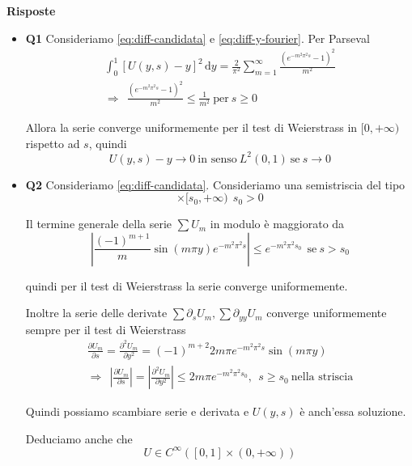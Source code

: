 \documentclass[10pt,a4paper,twoside,openright]{book}
\newcommand{\de}{\,\mathrm d}
\newcommand{\dy}{\de y}
\begin{document}
\textbf{Risposte}
\begin{itemize}
\item \textbf{Q1} Consideriamo \eqref{eq:diff-candidata} e \eqref{eq:diff-y-fourier}. Per Parseval
\begin{gather*}
    \int ^{1}_{0}[ U(y,s) -y]^{2} \dy=\frac{2}{\pi ^{2}}\sum\limits ^{\infty }_{m=1}\frac{\left(e^{-m^{2} \pi ^{2} s} -1\right)^{2}}{m^{2}}\\
    \Rightarrow \ \ \frac{\left(e^{-m^{2} \pi ^{2} s} -1\right)^{2}}{m^{2}} \leqslant \frac{1}{m^{2}} \ \text{per} \ s\geqslant 0
\end{gather*}

Allora la serie converge uniformemente per il test di Weierstrass in $[ 0,+\infty)$ rispetto ad $s$, quindi
\begin{equation*}
    U(y,s) -y\rightarrow 0\ \text{in senso} \ L^{2}(0,1) \ \text{se} \ s\rightarrow 0
\end{equation*}
\item \textbf{Q2} Consideriamo \eqref{eq:diff-candidata}. Consideriamo una semistriscia del tipo
\begin{equation*}
    [ 0,1] \times [ s_{0},+\infty) \ \ s_{0}  >0
\end{equation*}

Il termine generale della serie $\sum U_{m}$ in modulo è maggiorato da
\begin{equation*}
    \left| \frac{(-1)^{m+1}}{m}\sin(m\pi y) e^{-m^{2} \pi ^{2} s}\right| \leqslant e^{-m^{2} \pi ^{2} s_{0}} \ \ \text{se} \ s >s_{0}
\end{equation*}

quindi per il test di Weierstrass la serie converge uniformemente.

Inoltre la serie delle derivate $\sum \partial _{s} U_{m},\sum \partial _{yy} U_{m}$ converge uniformemente sempre per il test di Weierstrass
\begin{gather*}
    \frac{\partial U_{m}}{\partial s} =\frac{\partial ^{2} U_{m}}{\partial y^{2}} =(-1)^{m+2} 2m\pi e^{-m^{2} \pi ^{2} s}\sin(m\pi y)\\
    \Rightarrow \ \ \left| \frac{\partial U_{m}}{\partial s}\right| =\left| \frac{\partial ^{2} U_{m}}{\partial y^{2}}\right| \leqslant 2m \pi e^{-m^{2} \pi ^{2} s_{0}},\ \ s\geqslant s_{0} \ \text{nella striscia}
\end{gather*}

Quindi possiamo scambiare serie e derivata e $U(y,s)$ è anch'essa soluzione.

Deduciamo anche che
\begin{equation*}
    U\in C^{\infty }([ 0,1] \times (0,+\infty))
\end{equation*}


\end{itemize}
\end{document}
